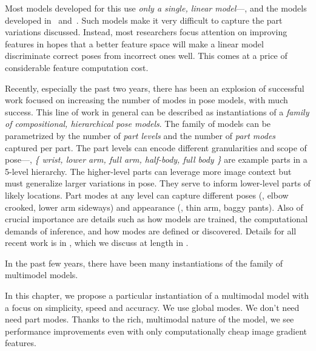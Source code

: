 Most models developed for this use {\em only a single, linear model}---\eg, 
\citet{devacrf,eichner09,andriluka09,ddtran} and the models developed 
in~ and~.
Such models make it very difficult to capture the part variations discussed.  
Instead, most researchers focus attention on improving features in hopes that a 
better feature space will make a linear model discriminate correct poses from 
incorrect ones well.  This comes at a price of considerable feature computation 
cost.  

Recently, especially the past two years, there has been an explosion of  successful work 
focused on increasing the number of modes in pose models, with much success.  
This line of work in general can be described as instantiations of a {\em 
family of compositional, hierarchical pose models}.  The family of models can 
be parametrized by the number of {\em part levels } and the number of {\em part 
modes} captured per part.  The part levels can encode different granularities 
and scope of pose---\eg, {\em \{ wrist, lower arm, full arm, half-body, full 
body \}} are example parts in a 5-level hierarchy.  The higher-level parts can 
leverage more image context but must generalize larger variations in pose.  
They serve to inform lower-level parts of likely locations.  Part modes at any 
level can capture different poses (\eg, elbow crooked, lower arm sideways) and 
appearance (\eg, thin arm, baggy pants).  Also of crucial importance are 
details such as how models are trained, the computational demands of inference, 
and how modes are defined or discovered.  Details for all recent work is in 
, which we discuss at length in .


 \begin{table}[tb]
\begin{center}
{\tiny

}
\caption[Family of multimodal pose models.]{In the past few years, there have 
been many instantiations of the family of multimodel models. }
\label{tab:rel-work-ps} \end{center}
\end{table}

 In this chapter, we propose a particular instantiation of 
a multimodal model with a focus on simplicity, speed and accuracy.  We use 
global modes.  We don't need need part modes.  Thanks to the rich, multimodal 
nature of the model, we see performance improvements even with only 
computationally cheap image gradient features.  

